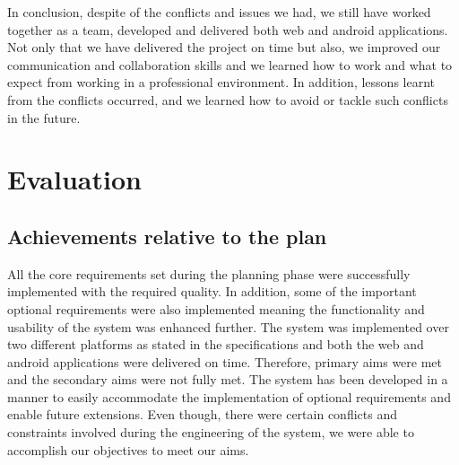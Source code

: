 \documentclass{article}
\begin{document}
In conclusion, despite of the conflicts and issues we had, we still have worked together as a team, developed and delivered both web and android applications. Not only that we have delivered the project on time but also, we improved our communication and collaboration skills and we learned how to work and what to expect from working in a professional environment. In addition, lessons learnt from the conflicts occurred, and we learned how to avoid or tackle such conflicts in the future. 

\newpage
\section{Evaluation}
\subsection{Achievements relative to the plan}
All the core requirements set during the planning phase were successfully implemented with the required quality. In addition, some of the important optional requirements were also implemented meaning the functionality and usability of the system was enhanced further. The system was implemented over two different platforms as stated in the specifications and both the web and android applications were delivered on time. Therefore, primary aims were met and the secondary aims were not fully met. The system has been developed in a manner to easily accommodate the implementation of optional requirements and enable future extensions. Even though, there were certain conflicts and constraints involved during the engineering of the system, we were able to accomplish our objectives to meet our aims. 
\end{document}
